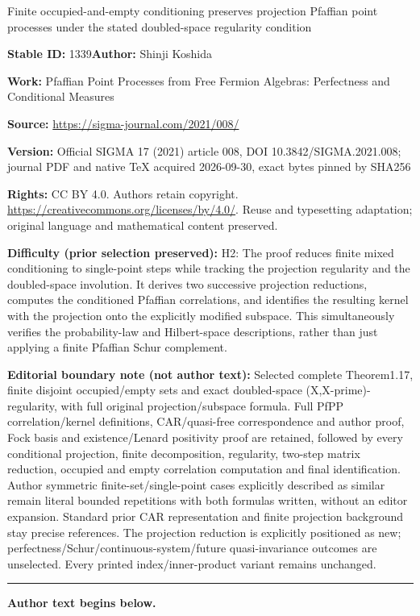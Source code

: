 \documentclass[11pt]{article}
\numberwithin{equation}{section}
\numberwithin{equation}{section}
\begin{document}
\begin{center}\Large Finite occupied-and-empty conditioning preserves projection Pfaffian point processes under the stated doubled-space regularity condition\end{center}
\noindent\textbf{Stable ID:} 1339\quad\textbf{Author:} Shinji Koshida\par
\noindent\textbf{Work:} Pfaffian Point Processes from Free Fermion Algebras: Perfectness and Conditional Measures\par
\noindent\textbf{Source:} \url{https://sigma-journal.com/2021/008/}\par
\noindent\textbf{Version:} Official SIGMA 17 (2021) article 008, DOI 10.3842/SIGMA.2021.008; journal PDF and native TeX acquired 2026-09-30, exact bytes pinned by SHA256\par
\noindent\textbf{Rights:} CC BY 4.0. Authors retain copyright. \url{https://creativecommons.org/licenses/by/4.0/}. Reuse and typesetting adaptation; original language and mathematical content preserved.\par
\noindent\textbf{Difficulty (prior selection preserved):} {\CJKfont H2: The proof reduces finite mixed conditioning to single-point steps while tracking the projection regularity and the doubled-space involution. It derives two successive projection reductions, computes the conditioned Pfaffian correlations, and identifies the resulting kernel with the projection onto the explicitly modified subspace. This simultaneously verifies the probability-law and Hilbert-space descriptions, rather than just applying a finite Pfaffian Schur complement.}\par
\medskip\noindent\textbf{Editorial boundary note (not author text):} Selected complete Theorem1.17, finite disjoint occupied/empty sets and exact doubled-space (X,X-prime)-regularity, with full original projection/subspace formula. Full PfPP correlation/kernel definitions, CAR/quasi-free correspondence and author proof, Fock basis and existence/Lenard positivity proof are retained, followed by every conditional projection, finite decomposition, regularity, two-step matrix reduction, occupied and empty correlation computation and final identification. Author symmetric finite-set/single-point cases explicitly described as similar remain literal bounded repetitions with both formulas written, without an editor expansion. Standard prior CAR representation and finite projection background stay precise references. The projection reduction is explicitly positioned as new; perfectness/Schur/continuous-system/future quasi-invariance outcomes are unselected. Every printed index/inner-product variant remains unchanged.\par
\medskip\hrule\medskip\noindent\textbf{Author text begins below.}\par
\setcounter{section}{1}\setcounter{subsection}{0}\setcounter{Theorem}{0}\setcounter{equation}{0}
\end{document}

